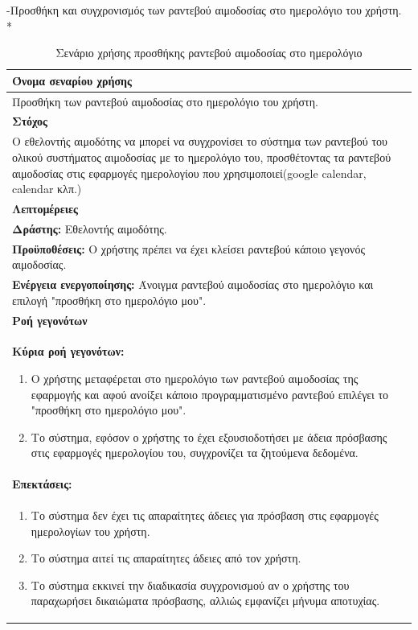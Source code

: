 \newpage			
-Προσθήκη και συγχρονισμός των ραντεβού αιμοδοσίας στο ημερολόγιο του χρήστη.
\\*
\begin{table}[H]
	\begin{center}
	    \begin{tabular}{|p{\dimexpr \linewidth-2\tabcolsep}|}
	    \hline
	    \rowcolor{grayy}
	    \textbf{Όνομα σεναρίου χρήσης}
	    \\ \hline    
	    Προσθήκη των ραντεβού αιμοδοσίας στο ημερολόγιο του χρήστη.
	     \\ \hline
	    \rowcolor{grayy}
	    \textbf{\textbf{Στόχος}}
	    \\ \hline
	 	 Ο εθελοντής αιμοδότης να μπορεί να συγχρονίσει το σύστημα των ραντεβού του ολικού συστήματος αιμοδοσίας με το ημερολόγιο του, προσθέτοντας τα  ραντεβού αιμοδοσίας στις εφαρμογές ημερολογίου που χρησιμοποιεί(google calendar, calendar κλπ.)
	    \\ \hline
	    \rowcolor{grayy}
	    \textbf{Λεπτομέρειες}
	    \\ \hline
		\textbf{Δράστης:} Εθελοντής αιμοδότης.
		\\*
		\textbf{Προϋποθέσεις:} Ο χρήστης πρέπει να έχει κλείσει ραντεβού κάποιο γεγονός αιμοδοσίας.
		\\*
		\textbf{Ενέργεια ενεργοποίησης:} Άνοιγμα ραντεβού αιμοδοσίας  στο ημερολόγιο και επιλογή "προσθήκη στο ημερολόγιο μου".
	    \\ \hline
		\rowcolor{grayy}    
	    \textbf{Ροή γεγονότων}
	    \\ \hline
		\textbf{Κύρια ροή γεγονότων:}
		\begin{enumerate}
		\item	 Ο χρήστης μεταφέρεται στο ημερολόγιο των ραντεβού αιμοδοσίας της εφαρμογής και αφού ανοίξει κάποιο προγραμματισμένο ραντεβού επιλέγει το "προσθήκη στο ημερολόγιο μου".
		\item  Το σύστημα, εφόσον ο χρήστης το έχει εξουσιοδοτήσει με άδεια πρόσβασης στις εφαρμογές ημερολογίου του, συγχρονίζει τα ζητούμενα δεδομένα.
		\end{enumerate}
		\\ \hline
		\rowcolor{grayy}
		\textbf{Επεκτάσεις:}
		   \\ \hline
		\begin{enumerate}
			\item Το σύστημα δεν έχει τις απαραίτητες άδειες για πρόσβαση στις εφαρμογές ημερολογίων του χρήστη.
			\item Το σύστημα αιτεί τις απαραίτητες άδειες από τον χρήστη.
			\item Το σύστημα εκκινεί την διαδικασία συγχρονισμού αν ο χρήστης του παραχωρήσει δικαιώματα πρόσβασης, αλλιώς εμφανίζει μήνυμα αποτυχίας.
		\end{enumerate}
		\\ \hline
	    \end{tabular}
	    \caption{Σενάριο χρήσης προσθήκης ραντεβού αιμοδοσίας στο ημερολόγιο}
	    \label{tab:add_blood_donation_to_calendar}
	\end{center}
\end{table}	

